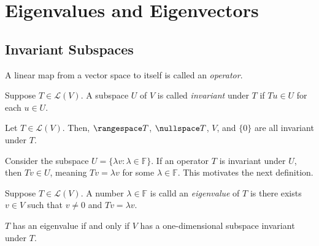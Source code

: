 \documentclass{article}
\begin{document}
\section{Eigenvalues and Eigenvectors}

\subsection{Invariant Subspaces}

\begin{definition}[operator]
  \label{def:operator}
  A linear map from a vector space to itself is called an \textit{operator}.
\end{definition}

\begin{definition}
  \label{def:invariant-subspace}
  Suppose $T \in \mathcal{L}(V)$. A subspace $U$ of $V$ is called
  \textit{invariant} under $T$ if $Tu \in U$ for each $u \in U$. 
\end{definition}

\begin{example}
  Let $T \in \mathcal{L}(V)$. Then, $\rangespace T$, $\nullspace T$,
  $V$, and $\{0\}$ are all invariant under $T$.
\end{example}

Consider the subspace $U = \{\lambda v : \lambda \in \mathbb{F}\}$. If
an operator $T$ is invariant under $U$, then $Tv \in U$, meaning $Tv =
\lambda v$ for some $\lambda \in \mathbb{F}$. This motivates the next definition.

\begin{definition}[eigenvalue]
  \label{def:eigenvalue}
  Suppose $T \in \mathcal{L}(V)$. A number $\lambda \in \mathbb{F}$ is
  calld an \textit{eigenvalue} of $T$ is there exists $v \in V$ such
  that $v \ne 0$ and $Tv = \lambda v$.
\end{definition}

\begin{remark}
  $T$ has an eigenvalue if and only if $V$ has a one-dimensional subspace
  invariant under $T$.
\end{remark}
\end{document}
